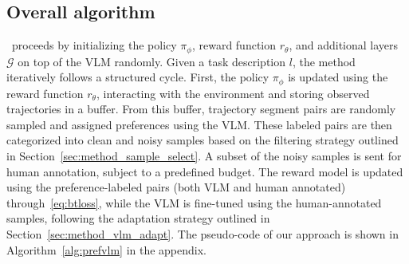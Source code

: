\subsection{Overall algorithm} \label{sec:method_overall}
\algo~proceeds by initializing the policy $\pi_\phi$, reward function $r_\theta$, and additional layers $\mathcal{G}$ on top of the VLM randomly. 
Given a task description $l$, the method iteratively follows a structured cycle. 
First, the policy $\pi_\phi$ is updated using %
the reward function $r_\theta$, interacting with the environment and storing observed trajectories in a buffer. From this buffer, trajectory segment pairs are randomly sampled and assigned preferences using the VLM. 
These labeled pairs are then categorized into clean and noisy samples based on the filtering strategy outlined in Section~\ref{sec:method_sample_select}. 
A subset of the noisy samples is sent for human annotation, subject to a predefined budget. 
The reward model is updated using the preference-labeled pairs (both VLM and human annotated) through~\eqref{eq:btloss}, while the VLM is fine-tuned using the human-annotated samples, following the adaptation strategy outlined in Section~\ref{sec:method_vlm_adapt}. 
The pseudo-code of our approach is shown in Algorithm~\ref{alg:prefvlm} in the appendix.